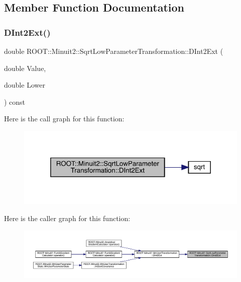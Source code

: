 \subsection{Member Function Documentation}
\mbox{\label{classROOT_1_1Minuit2_1_1SqrtLowParameterTransformation_ade7d793a9299b15dc6e218a11efdb15e}} 
\subsubsection{\texorpdfstring{DInt2Ext()}{DInt2Ext()}\hspace{0.1cm}{\footnotesize\ttfamily [1/2]}}
{\footnotesize\ttfamily double R\+O\+O\+T\+::\+Minuit2\+::\+Sqrt\+Low\+Parameter\+Transformation\+::\+D\+Int2\+Ext (\begin{DoxyParamCaption}\item[{double}]{Value,  }\item[{double}]{Lower }\end{DoxyParamCaption}) const}

Here is the call graph for this function\+:\nopagebreak
\begin{figure}[H]
\begin{center}
\leavevmode
\includegraphics[width=319pt]{df/db9/classROOT_1_1Minuit2_1_1SqrtLowParameterTransformation_ade7d793a9299b15dc6e218a11efdb15e_cgraph}
\end{center}
\end{figure}
Here is the caller graph for this function\+:\nopagebreak
\begin{figure}[H]
\begin{center}
\leavevmode
\includegraphics[width=350pt]{df/db9/classROOT_1_1Minuit2_1_1SqrtLowParameterTransformation_ade7d793a9299b15dc6e218a11efdb15e_icgraph}
\end{center}
\end{figure}
\mbox{\label{classROOT_1_1Minuit2_1_1SqrtLowParameterTransformation_ade7d793a9299b15dc6e218a11efdb15e}} 
